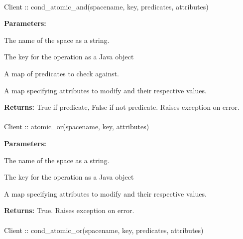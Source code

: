 \paragraph{}
\label{api:java:cond_atomic_and}
\begin{javacode}
Client :: cond_atomic_and(spacename, key, predicates, attributes)
\end{javacode}
\funcdesc 

\noindent\textbf{Parameters:}
\begin{description}[labelindent=\widthof{{\code{predicates}}},leftmargin=*,noitemsep,nolistsep,align=right]
\item[\code{spacename}] The name of the space as a string.
\item[\code{key}] The key for the operation as a Java object
\item[\code{predicates}] A map of predicates to check against.
\item[\code{attributes}] A map specifying attributes to modify and their respective values.
\end{description}

\noindent\textbf{Returns:}
True if predicate, False if not predicate.  Raises exception on error.

\paragraph{}
\label{api:java:atomic_or}
\begin{javacode}
Client :: atomic_or(spacename, key, attributes)
\end{javacode}
\funcdesc 

\noindent\textbf{Parameters:}
\begin{description}[labelindent=\widthof{{\code{attributes}}},leftmargin=*,noitemsep,nolistsep,align=right]
\item[\code{spacename}] The name of the space as a string.
\item[\code{key}] The key for the operation as a Java object
\item[\code{attributes}] A map specifying attributes to modify and their respective values.
\end{description}

\noindent\textbf{Returns:}
True.  Raises exception on error.

\paragraph{}
\label{api:java:cond_atomic_or}
\begin{javacode}
Client :: cond_atomic_or(spacename, key, predicates, attributes)
\end{javacode}
\funcdesc 


